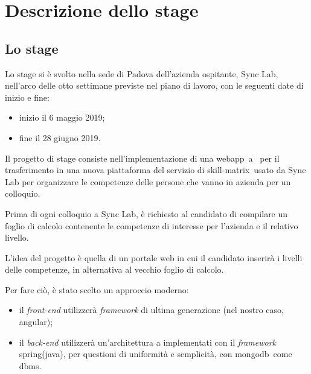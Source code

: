 
\chapter{Descrizione dello stage}\label{cap:descrizione-stage}



\section{Lo stage}

Lo stage si è svolto nella sede di Padova dell'azienda ospitante, Sync Lab, nell'arco delle otto settimane previste nel piano di lavoro, con le seguenti date di inizio e fine:
\begin{itemize}
	\item inizio il 6 maggio 2019;
	\item fine il 28 giugno 2019.
\end{itemize}
Il progetto di stage consiste nell'implementazione di una \gls{webapp}\gloss\ a \gloss\ per il trasferimento in una nuova piattaforma del servizio di \gls{skill-matrix}\gloss\ usato da Sync Lab per organizzare le competenze delle persone che vanno in azienda per un colloquio.

Prima di ogni colloquio a Sync Lab, è richiesto al candidato di compilare un foglio di calcolo contenente le competenze di interesse
per l'azienda e il relativo livello.

L'idea del progetto è quella di un portale web in cui il candidato inserirà i livelli delle competenze, in alternativa al vecchio foglio di calcolo.

Per fare ciò, è stato scelto un approccio moderno: 
\begin{itemize}
	\item il \textit{front-end} utilizzerà \textit{framework} di ultima generazione (nel nostro caso, \gls{angular}\gloss);
	\item il \textit{back-end} utilizzerà un'architettura a  implementati con il \textit{framework} \gls{spring}\gloss (\gls{java}\gloss), per questioni di uniformità e semplicità, con \gls{mongodb}\gloss\ come \gls{dbms}\gloss.
\end{itemize}


